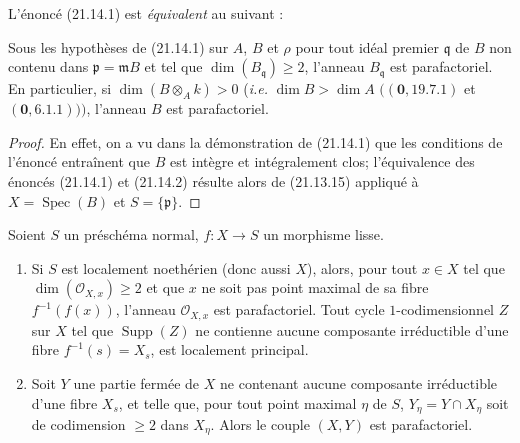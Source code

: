 L'énoncé (21.14.1) est \emph{équivalent} au suivant :

\begin{corollary}[21.14.2]
\label{IV.21.14.2}
Sous les hypothèses de (21.14.1) sur $A$, $B$ et $\rho$ pour tout idéal premier
$\mathfrak q$ de $B$ non contenu dans $\mathfrak p=\mathfrak mB$ et tel que
$\dim(B_\mathfrak q)\geq2$, l'anneau $B_\mathfrak q$ est parafactoriel. En
particulier, si $\dim(B\otimes_A k)>0$ (\emph{i.e.} $\dim B>\dim A$
$((\mathbf 0, 19.7.1)$ et $(\mathbf 0, 6.1.1)))$, l'anneau $B$ est parafactoriel.
\end{corollary}

\begin{proof}
En effet, on a vu dans la démonstration de (21.14.1) que les conditions de l'énoncé
entraînent que $B$ est intègre et intégralement clos; l'équivalence des énoncés
(21.14.1) et (21.14.2) résulte alors de (21.13.15) appliqué à
$X=\operatorname{Spec}(B)$ et $S=\{\mathfrak p\}$.
\end{proof}

\begin{proposition}[21.14.3]
\label{IV.21.14.3}
Soient $S$ un préschéma normal, $f:X\to S$ un morphisme lisse.
\begin{enumerate}[label=(\roman*)]
  \item Si $S$ est localement noethérien (donc aussi $X$), alors, pour tout $x\in X$
  tel que $\dim(\mathcal O_{X,x})\geq2$ et que $x$ ne soit pas point maximal de sa
  fibre $f^{-1}(f(x))$, l'anneau $\mathcal O_{X,x}$ est parafactoriel. Tout cycle
  $1$-codimensionnel $Z$ sur $X$ tel que $\operatorname{Supp}(Z)$ ne contienne aucune
  composante irréductible d'une fibre $f^{-1}(s)=X_s$, est localement principal.
  \item Soit $Y$ une partie fermée de $X$ ne contenant aucune composante irréductible
  d'une fibre $X_s$, et telle que, pour tout point maximal $\eta$ de $S$,
  $Y_\eta=Y\cap X_\eta$ soit de codimension $\geq2$ dans $X_\eta$. Alors le couple
  $(X,Y)$ est parafactoriel.
\end{enumerate}
\end{proposition}

